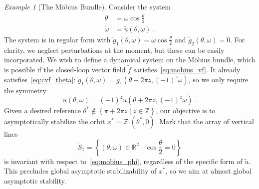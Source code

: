 \documentclass{article}
\theoremstyle{definition}
\theoremstyle{remark}
\newtheorem{example}{Example}
\newcommand{\bscdot}{\boldsymbol{\cdot}}
\newcommand{\IN}{\mathbb{Z}}	%
\newcommand{\RR}{\mathbb{R}}	%
\begin{document}
\begin{example}[The M\"obius Bundle] \label{exa:MobiusII}
 Consider the system
 \begin{equation} \label{eq:mobius_phi}
 \begin{aligned}
  \dot{\theta} &= \omega \cos \frac{\theta}{2} \\
  \dot{\omega} &= \tilde{u}(\theta,\omega) \;.
 \end{aligned}
 \end{equation}
 The system is in regular form with $\tilde{g}_1(\theta,\omega) = \omega \cos \frac{\theta}{2}$ and
 $\tilde{g}_2(\theta,\omega) = 0$. For clarity, we neglect perturbations at the moment, but these can be easily
 incorporated. We wish to define a dynamical system on the M\"obius bundle,
 which is possible if the closed-loop vector field $\tilde{f}$ satisfies~\eqref{eq:mobius_vf}. It already
 satisfies~\eqref{eq:cvf_theta}: $\tilde{g}_1(\theta,\omega) = \tilde{g}_1(\theta+2\pi z,(-1)^z\omega)$,
 so we only require the symmetry
 \begin{equation} \label{eq:mobius_v_sim}
  \tilde{u}(\theta,\omega) = (-1)^z\tilde{u}(\theta+2\pi z,(-1)^z\omega) \;.
 \end{equation}
 Given a desired reference $\theta^* \not\in \left\{ \pi+2\pi z \mid z \in \IN  \right\}$, 
 our objective is to asymptotically stabilize the orbit $x^* = \IN\bscdot(\theta^*,0)$. 
 Mark that the array of vertical lines
 \begin{equation} \label{eq:vertical}
  \tilde{S}_1 = \left\{ (\theta,\omega) \in \RR^2 \mid \cos \frac{\theta}{2} = 0 \right\}
 \end{equation}
 is invariant with respect to~\eqref{eq:mobius_phi}, regardless of the specific form of $\tilde{u}$.
 This precludes global asymptotic stabilizability of $x^*$, so we aim at almost global asymptotic
 stability.


\end{example}
\end{document}
